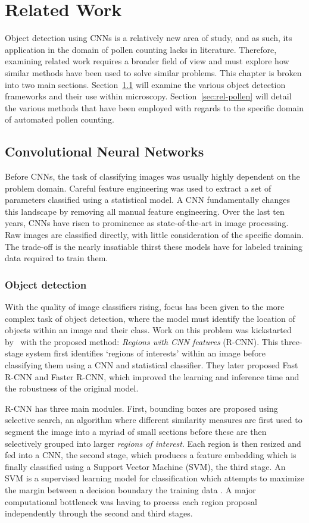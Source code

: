 \chapter{Related Work}\label{cha:related}
Object detection using CNNs is a relatively new area of study, and as such, its application in the domain of pollen counting lacks in literature.
Therefore, examining related work requires a broader field of view and must explore how similar methods have been used to solve similar problems.
This chapter is broken into two main sections.
Section~\ref{sec:rel-cnn} will examine the various object detection frameworks and their use within microscopy.
Section~\ref{sec:rel-pollen} will detail the various methods that have been employed with regards to the specific domain of automated pollen counting.

\section{Convolutional Neural Networks}\label{sec:rel-cnn}
Before CNNs, the task of classifying images was usually highly dependent on the problem domain.
Careful feature engineering was used to extract a set of parameters classified using a statistical model.
A CNN fundamentally changes this landscape by removing all manual feature engineering.
Over the last ten years, CNNs have risen to prominence as state-of-the-art in image processing.
Raw images are classified directly, with little consideration of the specific domain.
The trade-off is the nearly insatiable thirst these models have for labeled training data required to train them.

\subsection{Object detection}
With the quality of image classifiers rising, focus has been given to the more complex task of object detection, where the model must identify the location of objects within an image and their class.
Work on this problem was kickstarted by\ \textcite{girshick_rich_2014} with the proposed method: \textit{Regions with CNN features} (R-CNN). This three-stage system first identifies `regions of interests' within an image before classifying them using a CNN and statistical classifier.
They later proposed Fast R-CNN and Faster R-CNN, which improved the learning and inference time and the robustness of the original model.

R-CNN has three main modules.
First, bounding boxes are proposed using selective search, an algorithm where different similarity measures are first used to segment the image into a myriad of small sections before these are then selectively grouped into larger \textit{regions of interest}.
Each region is then resized and fed into a CNN, the second stage, which produces a feature embedding which is finally classified using a Support Vector Machine (SVM), the third stage.
An SVM is a supervised learning model for classification which attempts to maximize the margin between a decision boundary the training data \parencite{bosertraining}.
A major computational bottleneck was having to process each region proposal independently through the second and third stages.

